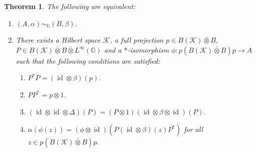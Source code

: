\documentclass[reqno]{amsart}
\numberwithin{equation}{section}
\newtheorem{Theorem}{Theorem}[section]
\DeclareMathOperator{\id}{\mathrm{id}}
\newcommand{\G}{\mathbb{G}}
\newcommand{\ovot}{\bar{\otimes}}
\begin{document}
\begin{Theorem}\label{char2} The following are equivalent:
      \begin{enumerate}\setlength\itemsep{-0.5em}
        \item $(A, \alpha)\sim_\G (B, \beta)$.
        \item There exists a Hilbert space $\mathcal{K}$, a full projection $p\in B(\mathcal{K})\ovot B$, $P\in B(\mathcal{K})\ovot B \ovot L^\infty(\G)$ and a $*$-isomorphism $\phi: p(B(\mathcal{K})\ovot B)p\to A$ such that the following conditions are satisfied:
    \begin{enumerate}\setlength\itemsep{-0.5em}
        \item $P^*P=(\id \otimes \beta)(p)$.
        \item $PP^* = p\otimes 1$.
        \item $(\id \otimes \id \otimes \Delta)(P) = (P\otimes 1)(\id \otimes \beta \otimes \id)(P).$
        \item $\alpha(\phi(z)) = (\phi\otimes \id)(P(\id \otimes \beta)(z)P^*)$ for all $z\in p(B(\mathcal{K})\ovot B)p.$
    \end{enumerate}
    \end{enumerate}
\end{Theorem}
\end{document}

